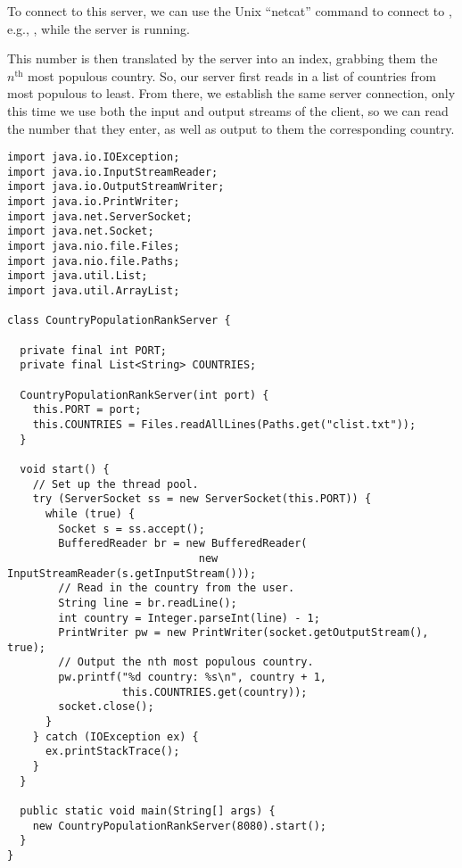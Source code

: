 To connect to this server, we can use the Unix  ``netcat'' command to connect to , e.g., , while the server is running.

This number is then translated by the server into an index, grabbing them the~$n^{\text{th}}$ most populous country. 
So, our server first reads in a list of countries from most populous to least. 
From there, we establish the same server connection, only this time we use both the input and output streams of the client, so we can read the number that they enter, as well as output to them the corresponding country.

\begin{lstlisting}[language=MyJava]
import java.io.IOException;
import java.io.InputStreamReader;
import java.io.OutputStreamWriter;
import java.io.PrintWriter;
import java.net.ServerSocket;
import java.net.Socket;
import java.nio.file.Files;
import java.nio.file.Paths;
import java.util.List;
import java.util.ArrayList;

class CountryPopulationRankServer {

  private final int PORT;
  private final List<String> COUNTRIES;

  CountryPopulationRankServer(int port) {
    this.PORT = port;
    this.COUNTRIES = Files.readAllLines(Paths.get("clist.txt"));
  }

  void start() {
    // Set up the thread pool.
    try (ServerSocket ss = new ServerSocket(this.PORT)) {
      while (true) {
        Socket s = ss.accept();
        BufferedReader br = new BufferedReader(
                              new InputStreamReader(s.getInputStream()));
        // Read in the country from the user.
        String line = br.readLine();
        int country = Integer.parseInt(line) - 1;
        PrintWriter pw = new PrintWriter(socket.getOutputStream(), true);
        // Output the nth most populous country.
        pw.printf("%d country: %s\n", country + 1, 
                  this.COUNTRIES.get(country));
        socket.close();
      }
    } catch (IOException ex) { 
      ex.printStackTrace(); 
    }
  }

  public static void main(String[] args) {
    new CountryPopulationRankServer(8080).start();
  }
}
\end{lstlisting}

